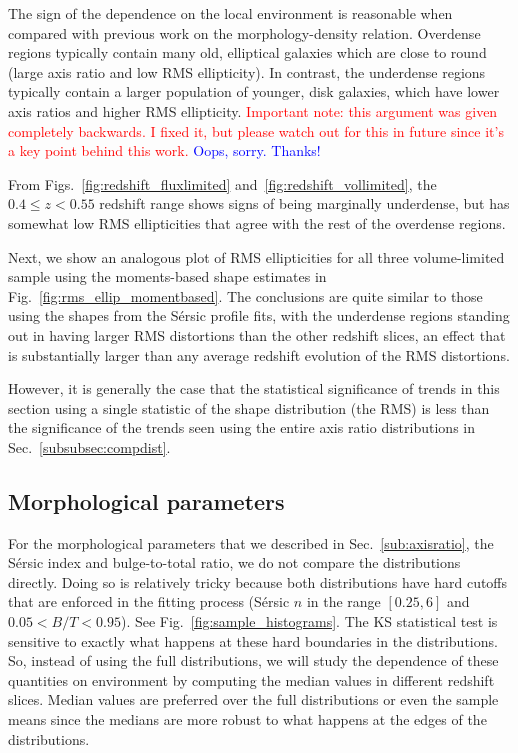 \documentclass[twocolumn,useAMS,usenatbib]{mn2e}
\newcommand{\rachel}[1]{{\textcolor{red}{#1}}}
\newcommand{\arun}[1]{{\textcolor{blue}{#1}}}
\newcommand{\sersic}{S\'{e}rsic }
\begin{document}
The sign of the dependence on the local environment is reasonable when
compared with previous work on the morphology-density
relation. Overdense regions typically contain many old, elliptical
galaxies which are close to round (large axis ratio and low RMS ellipticity). 
In contrast, the underdense regions typically contain a larger
population of younger, disk galaxies, which have lower axis ratios and
higher RMS ellipticity. \rachel{Important note: this argument was
  given completely backwards.  I fixed it, but please watch out for
  this in future since it's a key point behind this work.} \arun{Oops, sorry. Thanks!}

From Figs.~\ref{fig:redshift_fluxlimited} and~\ref{fig:redshift_vollimited},
the $0.4\le z < 0.55$ redshift range shows signs of being marginally
underdense, but has somewhat low RMS ellipticities that agree with the rest of the overdense regions.

Next, we show an analogous plot of RMS ellipticities %
for all three
volume-limited sample using the moments-based shape estimates in
Fig.~\ref{fig:rms_ellip_momentbased}. The conclusions are quite
similar to those using the shapes from the \sersic profile fits, with
the underdense regions standing out in having larger RMS distortions 
than the other redshift slices, an effect that is substantially larger
than any average redshift evolution of the RMS distortions.

However, it is generally the case that the statistical significance of
trends in this section using a single statistic of the shape
distribution (the RMS) is less than the significance of the trends
seen using the entire axis ratio distributions in Sec.~\ref{subsubsec:compdist}.

\subsection{Morphological parameters}

For the morphological parameters that we described in
Sec.~\ref{sub:axisratio}, the \sersic index and bulge-to-total ratio,
we do not compare the distributions directly.  Doing so is relatively
tricky because both distributions have hard cutoffs that are enforced
in the fitting process (\sersic $n$ in the range $[0.25, 6]$ and
$0.05<B/T<0.95$). See Fig.~\ref{fig:sample_histograms}.
The KS statistical test is sensitive to exactly what happens at these hard boundaries in the distributions.
So, instead of using the full distributions, we will study the
dependence of these quantities on environment by computing the median
values in different redshift slices.  Median values are preferred
over the full distributions or even the sample means since the medians
are more robust to what happens at the edges of the distributions.
\end{document}
